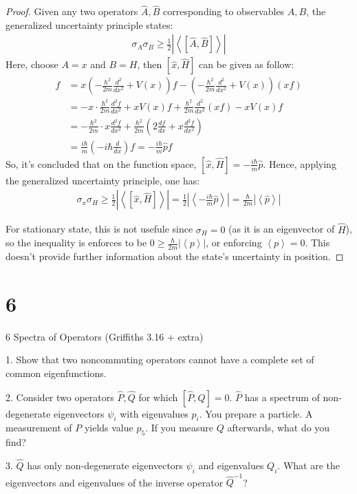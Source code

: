 \documentclass{article}
\begin{document}
\begin{proof}
    Given any two operators $\hat{A},\hat{B}$ corresponding to observables $A,B$, the generalized uncertainty principle states:
    \begin{align}
        \sigma_A\sigma_B \geq \frac{1}{2}\left|\left<[\hat{A},\hat{B}]\right>\right|
    \end{align}
    Here, choose $A=x$ and $B=H$, then $[\hat{x},\hat{H}]$ can be given as follow:
    \begin{align}
        [\hat{x},\hat{H}]f &= x\left(-\frac{\hbar^2}{2m}\frac{d^2}{dx^2}+V(x)\right)f - \left(-\frac{\hbar^2}{2m}\frac{d^2}{dx^2}+V(x)\right)(xf)\\
        &= -x\cdot \frac{\hbar^2}{2m}\frac{d^2f}{dx^2} + xV(x)f + \frac{\hbar^2}{2m}\frac{d^2}{dx^2}(xf) - xV(x)f\\
        &= -\frac{\hbar^2}{2m}\cdot x\frac{d^2f}{dx^2} + \frac{\hbar^2}{2m}\left(2\frac{df}{dx}+x\frac{d^2f}{dx^2}\right)\\
        &= \frac{i\hbar}{m}\left(-i\hbar\frac{d}{dx}\right)f = -\frac{i\hbar}{m}\hat{p}f
    \end{align}
    So, it's concluded that on the function space, $[\hat{x},\hat{H}] = -\frac{i\hbar}{m}\hat{p}$. Hence, applying the generalized uncertainty principle, one has:
    \begin{align}
        \sigma_x\sigma_H \geq \frac{1}{2}\left|\left<[\hat{x},\hat{H}]\right>\right| = \frac{1}{2}\left|\left<-\frac{i\hbar}{m}\hat{p}\right>\right| = \frac{\hbar}{2m}\left|\left<\hat{p}\right>\right|
    \end{align}

    For stationary state, this is not usefule since $\sigma_H = 0$ (as it is an eigenvector of $\hat{H}$), so the inequality is enforces to be $0\geq \frac{\hbar}{2m}\left|\left<p\right>\right|$, or enforcing $\left<p\right>=0$. This doesn't provide further information about the state's uncertainty in position.
\end{proof} 

\newpage

\section*{6}
\begin{ques}\label{q6}
6 Spectra of Operators (Griffiths 3.16 + extra)

1. Show that two noncommuting operators cannot have a complete set of common eigenfunctions.

2. Consider two operators $\hat{P},\hat{Q}$ for which $[\hat{P},\hat{Q}]=0$. $\hat{P}$ has a spectrum of non-degenerate eigenvectors $\psi_i$ with eigenvalues $p_i$. You prepare a particle. A measurement of $P$ yields value $p_5$. If you measure $Q$ afterwards, what do you find?

3. $\hat{Q}$ has only non-degenerate eigenvectors $\psi_i$ and eigenvalues $Q_i$. What are the eigenvectors and eigenvalues of the inverse operator $\hat{Q}^{-1}$?
\end{ques}
\end{document}
